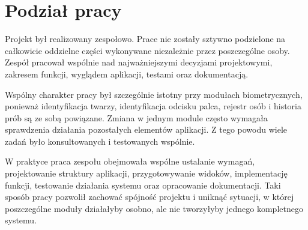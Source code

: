 \section{Podział pracy}

Projekt był realizowany zespołowo. Prace nie zostały sztywno podzielone na całkowicie oddzielne części wykonywane niezależnie przez poszczególne osoby. Zespół pracował wspólnie nad najważniejszymi decyzjami projektowymi, zakresem funkcji, wyglądem aplikacji, testami oraz dokumentacją.

Wspólny charakter pracy był szczególnie istotny przy modułach biometrycznych, ponieważ identyfikacja twarzy, identyfikacja odcisku palca, rejestr osób i historia prób są ze sobą powiązane. Zmiana w jednym module często wymagała sprawdzenia działania pozostałych elementów aplikacji. Z tego powodu wiele zadań było konsultowanych i testowanych wspólnie.

W praktyce praca zespołu obejmowała wspólne ustalanie wymagań, projektowanie struktury aplikacji, przygotowywanie widoków, implementację funkcji, testowanie działania systemu oraz opracowanie dokumentacji. Taki sposób pracy pozwolił zachować spójność projektu i uniknąć sytuacji, w której poszczególne moduły działałyby osobno, ale nie tworzyłyby jednego kompletnego systemu.